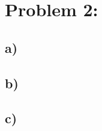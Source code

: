 \section*{{Problem 2:}} 


\subsection*{a) }


\subsection*{b) } 


\subsection*{c) } 




 







